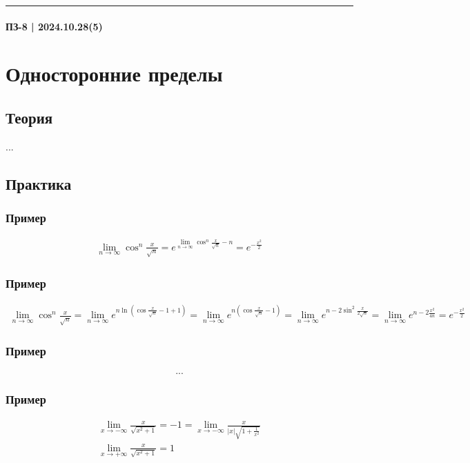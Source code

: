 \documentclass{article}
\begin{document}
\par\noindent\rule{\textwidth}{1pt}
\paragraph{ПЗ-8 | 2024.10.28(5)}
\section{Односторонние пределы}

\subsection{Теория}
...


\subsection{Практика}

\subsubsection{Пример}
\begin{gather*}
    \lim_{n \to \infty} \cos^n \frac{x}{\sqrt{n}} = 
    e^{\lim_{n \to \infty} \cos^n \frac{x}{\sqrt{n}} - n} = 
    e^{-\frac{x^2}{2}}
\end{gather*}

\subsubsection{Пример}
\begin{gather*}
    \lim_{n \to \infty} \cos^n \frac{x}{\sqrt{n}} = 
    \lim_{n \to \infty} e^{n \ln (\cos \frac{x}{\sqrt{n}} - 1 + 1)} = 
    \lim_{n \to \infty} e^{n (\cos \frac{x}{\sqrt{n}} - 1)} =
    \lim_{n \to \infty} e^{n -2\sin^2 \frac{x}{2 \sqrt{n}}} =
    \lim_{n \to \infty} e^{n -2 \frac{x^2}{4n}} = e^{-\frac{x^2}{2}}
\end{gather*}

\subsubsection{Пример}
\begin{gather*}
    ...
\end{gather*}

\subsubsection{Пример}
\begin{gather*}
    \lim_{x \to -\infty} \frac{x}{\sqrt{x^2 + 1}} = -1 = 
    \lim_{x \to -\infty} \frac{x}{|x| \sqrt{1 + \frac{1}{x^2}}} \\
    \lim_{x \to +\infty} \frac{x}{\sqrt{x^2 + 1}} = 1
\end{gather*}
\end{document}

